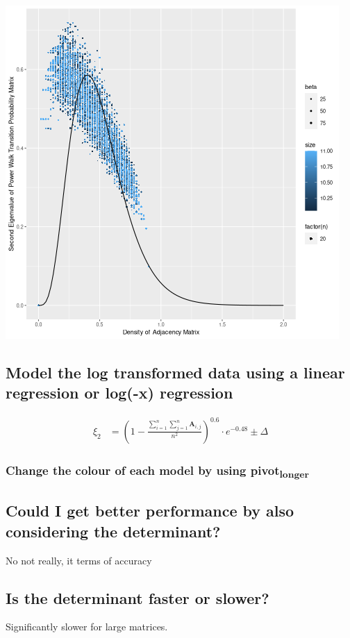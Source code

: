 \documentclass[11pt]{article}
\begin{document}
\begin{center}
\includegraphics[width=.9\linewidth]{../Media/EigenValue_Density_Chi.png}
\end{center}

\subsection{Model the log transformed data using a linear regression or log(-x) regression}
\label{sec:orga7d2a24}

\begin{align}
    \xi_2 &= \left( 1-  \frac{\sum^{n}_{i= 1} \sum^{n}_{j= 1}   \mathbf{A}_{i,j}  }{n^{2}} \right)^{0.6} \cdot  e^{- 0.48} \pm \Delta
\end{align}

\subsubsection{Change the colour of each model by using pivot\textsubscript{longer}}
\label{sec:org60eb1ea}
\subsection{Could I get better performance by also considering the determinant?}
\label{sec:org272e5aa}
No not really, it terms of accuracy

\subsection{Is the determinant faster or slower?}
\label{sec:org8edfd48}
Significantly slower for large matrices.
\end{document}
